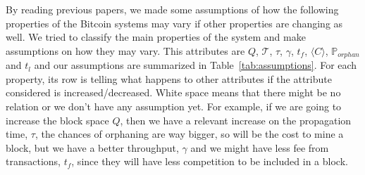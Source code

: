 \documentclass[USenglish]{uit-thesis}
\begin{document}
By reading previous papers, we made some assumptions of how
the following properties of the Bitcoin systems may vary if other
properties are changing as well. We tried to classify the main
properties of the system and make assumptions on how they
may vary. This attributes are $Q$, $\mathcal{T}$, $\tau$,
$\gamma$, $t_f$, $\langle C\rangle$, $\mathbb{P}_{orphan}$ and $t_l$ and
our assumptions are summarized in Table~\ref{tab:assumptions}. For
each property, its row is telling what happens to other attributes
if the attribute considered is increased/decreased. White space
means that there might be no relation or we don't have any assumption
yet. For example, if we are going to increase the block space $Q$,
then we have a relevant increase on the propagation time, $\tau$,
the chances of orphaning are way bigger, so will be the cost to mine a block,
but we have a better throughput, $\gamma$ and we might have
less fee from transactions, $t_f$, since they will have less competition
to be included in a block.
\end{document}
